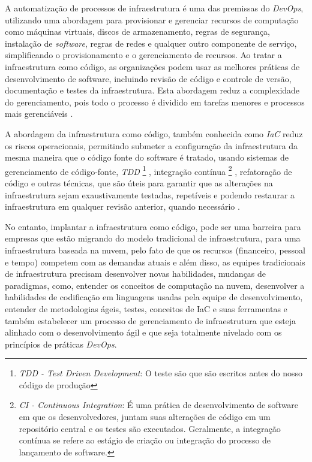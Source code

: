 A automatização de processos de infraestrutura é uma das premissas do \textit{DevOps}, utilizando uma abordagem para provisionar e gerenciar recursos de computação como máquinas virtuais, discos de armazenamento, regras de segurança, instalação de \textit{software}, regras de redes e qualquer outro componente de serviço, simplificando o provisionamento e o gerenciamento de recursos. Ao tratar a infraestrutura como código, as organizações podem usar as melhores práticas de desenvolvimento de software, incluindo revisão de código e controle de versão, documentação e testes da infraestrutura. Esta abordagem reduz a complexidade do gerenciamento, pois todo o processo é dividido em tarefas  menores e  processos  mais gerenciáveis \cite{Morris:2016:ICM:3006361}.

A abordagem da infraestrutura como código, também conhecida como \textit{IaC} reduz os riscos operacionais, permitindo submeter a configuração da infraestrutura da mesma maneira que o código fonte do software é tratado, usando sistemas de gerenciamento de código-fonte, \textit{TDD} \footnote{\textit{TDD - Test Driven Development}: O teste são que são escritos antes do nosso código de produção} , integração contínua \footnote{\textit{CI - Continuous Integration}: É uma prática de desenvolvimento de software em que os desenvolvedores, juntam suas alterações de código em um repositório central e os testes são executados. Geralmente, a integração contínua se refere ao estágio de criação ou integração do processo de lançamento de software.} , refatoração de código e outras técnicas, que são úteis para garantir que as alterações na infraestrutura sejam exaustivamente testadas, repetíveis e podendo restaurar a infraestrutura em qualquer revisão anterior, quando necessário \cite{Morris:2016:ICM:3006361}.


No entanto, implantar a infraestrutura como código, pode ser uma barreira para empresas que estão migrando do modelo tradicional de infraestrutura, para uma infraestrutura baseada na nuvem, pelo fato de que os recursos (financeiro, pessoal e tempo) competem com as demandas atuais e além disso, as equipes tradicionais de infraestrutura precisam desenvolver novas habilidades, mudanças de paradigmas, como, entender os conceitos de computação na nuvem, desenvolver a habilidades de codificação em linguagens usadas pela equipe de desenvolvimento, entender de metodologias ágeis, testes, conceitos de IaC e suas ferramentas e também estabelecer um processo de gerenciamento de infraestrutura que esteja alinhado com o desenvolvimento ágil e que seja totalmente nivelado com os princípios de práticas \textit{DevOps}. 


